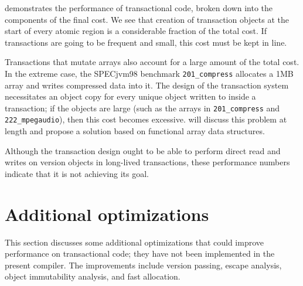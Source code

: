  demonstrates the performance of transactional
code, broken down into the components of the final cost.  We see that
creation of transaction objects at the start of every atomic region is
a considerable fraction of the total cost.  If transactions are going
to be frequent and small, this cost must be kept in line.

Transactions that mutate arrays also account for a large amount of
the total cost.  In the extreme case, the SPECjvm98 benchmark
\texttt{201\_compress} allocates a 1MB array and writes compressed
data into it.  The design of the \apex transaction system necessitates an
object copy for every unique object written to inside a transaction;
if the objects are large (such as the arrays in
\texttt{201\_compress} and \texttt{222\_mpegaudio}), then this cost
becomes excessive.   will discuss this problem at
length and propose a solution based on functional array data
structures.

Although the \apex transaction design ought to be able to perform direct
read and writes on version objects in long-lived transactions, these
performance numbers indicate that it is not achieving its goal.


\section{Additional optimizations}\label{sec:moreopt}

This section discusses some additional optimizations
that could improve performance on transactional code; they have
not been implemented in the present compiler.  The improvements
include version passing, escape analysis, object immutability
analysis, and fast allocation.

